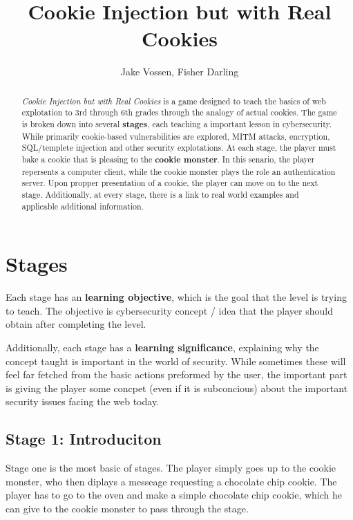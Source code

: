 \documentclass{article}
\begin{document}
\title{Cookie Injection but with Real Cookies}
\author{Jake Vossen, Fisher Darling}

\maketitle

\begin{abstract}
  
\textit{Cookie Injection but with Real Cookies} is a
game designed to teach the basics of web explotation to 3rd through
6th grades through the analogy of actual cookies. The game is broken
down into several \textbf{stages}, each teaching a important lesson in
cybersecurity. While primarily cookie-based vulnerabilities are
explored, MITM attacks, encryption, SQL/templete injection and other
security explotations. At each stage, the player must bake a cookie
that is pleasing to the \textbf{cookie monster}. In this senario, the
player repersents a computer client, while the cookie monster plays
the role an authentication server. Upon propper presentation of a
cookie, the player can move on to the next stage. Additionally, at
every stage, there is a link to real world examples and applicable
additional information.

\end{abstract}

\section{Stages}

Each stage has an \textbf{learning objective}, which is the goal that
the level is trying to teach. The objective is cybersecurity concept /
idea that the player should obtain after completing the level.

Additionally, each stage has a \textbf{learning significance},
explaining why the concept taught is important in the world of
security. While sometimes these will feel far fetched from the basic
actions preformed by the user, the important part is giving the player
some concpet (even if it is subconcious) about the important security
issues facing the web today.

\subsection{Stage 1: Introduciton}

Stage one is the most basic of stages. The player simply goes up to
the cookie monster, who then diplays a messeage requesting a chocolate
chip cookie. The player has to go to the oven and make a simple
chocolate chip cookie, which he can give to the cookie monster to pass
through the stage.
\end{document}
